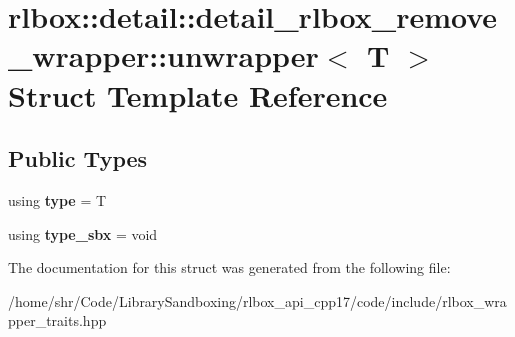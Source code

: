 \hypertarget{structrlbox_1_1detail_1_1detail__rlbox__remove__wrapper_1_1unwrapper}{}\section{rlbox\+:\+:detail\+:\+:detail\+\_\+rlbox\+\_\+remove\+\_\+wrapper\+:\+:unwrapper$<$ T $>$ Struct Template Reference}
\label{structrlbox_1_1detail_1_1detail__rlbox__remove__wrapper_1_1unwrapper}
\subsection*{Public Types}
\begin{DoxyCompactItemize}
\item 
\mbox{\label{structrlbox_1_1detail_1_1detail__rlbox__remove__wrapper_1_1unwrapper_a880e2c32e27505ebf9e71b896b586c37}} 
using {\bfseries type} = T
\item 
\mbox{\label{structrlbox_1_1detail_1_1detail__rlbox__remove__wrapper_1_1unwrapper_ac48201968ef70435a4da5ce89e8993f7}} 
using {\bfseries type\+\_\+sbx} = void
\end{DoxyCompactItemize}


The documentation for this struct was generated from the following file\+:\begin{DoxyCompactItemize}
\item 
/home/shr/\+Code/\+Library\+Sandboxing/rlbox\+\_\+api\+\_\+cpp17/code/include/rlbox\+\_\+wrapper\+\_\+traits.\+hpp\end{DoxyCompactItemize}
